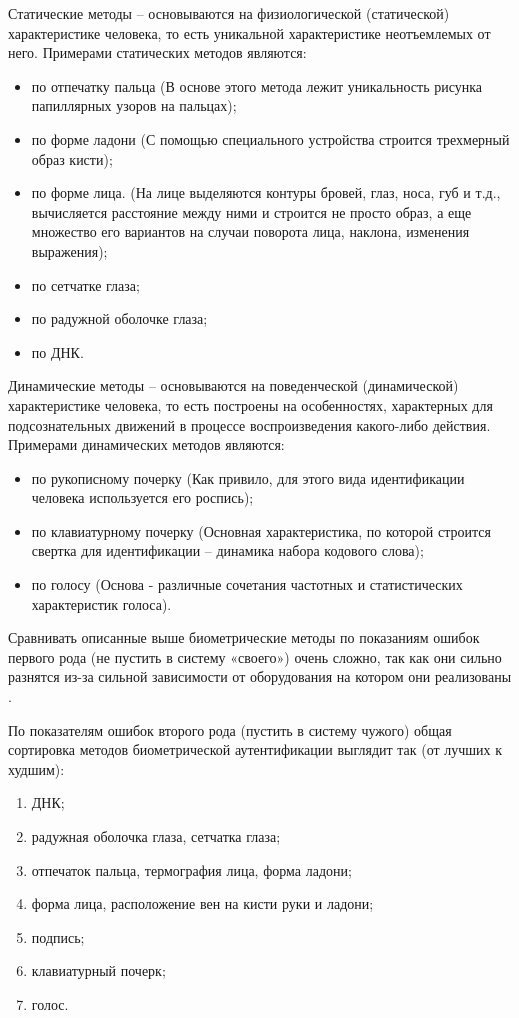 Статические методы -- основываются на физиологической (статической) характеристике человека, то есть уникальной характеристике неотъемлемых от него.
Примерами статических методов являются:
\begin{itemize}
  \item по отпечатку пальца (В основе этого метода лежит уникальность рисунка папиллярных узоров на пальцах);
  \item по форме ладони (С помощью специального устройства строится трехмерный образ кисти);
  \item по форме лица. (На лице выделяются контуры бровей, глаз, носа, губ и т.д., вычисляется расстояние между ними и строится не просто образ, а еще множество его вариантов на случаи поворота лица, наклона, изменения выражения);
  \item по сетчатке глаза;
  \item по радужной оболочке глаза;
  \item по ДНК.
\end{itemize}

Динамические методы -- основываются на поведенческой (динамической) характеристике человека, то есть построены на особенностях, характерных для подсознательных движений в процессе воспроизведения какого-либо действия.
Примерами динамических методов являются:
\begin{itemize}
  \item по рукописному почерку (Как привило, для этого вида идентификации человека используется его роспись);
  \item по клавиатурному почерку (Основная характеристика, по которой строится свертка для идентификации – динамика набора кодового слова);
  \item по голосу (Основа - различные сочетания частотных и статистических характеристик голоса).
\end{itemize}
Сравнивать описанные выше биометрические методы по показаниям ошибок первого рода (не пустить в систему «своего») очень сложно, так как они сильно разнятся из-за сильной зависимости от оборудования на котором они реализованы .

По показателям ошибок второго рода (пустить в систему чужого) общая сортировка методов биометрической аутентификации выглядит так (от лучших к худшим):
\begin{enumerate}
  \item ДНК;
  \item радужная оболочка глаза, сетчатка глаза;
  \item отпечаток пальца, термография лица, форма ладони;
  \item форма лица, расположение вен на кисти руки и ладони;
  \item подпись;
  \item клавиатурный почерк;
  \item голос.
\end{enumerate}

